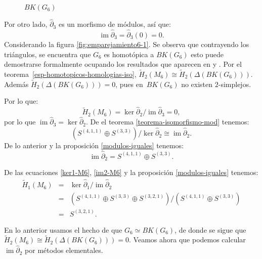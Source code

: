 \documentclass[12pt]{book}
\theoremstyle{definition}
\DeclareMathOperator{\im}{im}
\newcounter{in}
\newcounter{ini}
\begin{document}
\begin{figure}[h]
\begin{center}
\begin{minipage}{0.45\linewidth}
      \caption{$BK(G_{6})$}
      \label{grafica-contraible-M6}
    \end{minipage}
  \end{center}
\end{figure}

Por otro lado, $\widehat\partial_{3}$ es un morfismo de módulos, así que:
\begin{equation*}
  \im\widehat\partial_{3}=\widehat\partial_{3}(0)=0.
  \label{im3-KM5}
\end{equation*}
Considerando la figura \ref{fig:emparejamiento6-1}. Se observa que contrayendo los
triángulos, se encuentra que $G_{6}$ es homotópica a $BK(G_{6})$ esto
puede demostrarse formalmente ocupando los resultados que aparecen en
\cite{LPV08a} y \cite{Pri92}. Por el teorema~\ref{esp-homotopicos-homologias-iso}, $\widetilde
H_{2}(M_{6})\cong\widetilde H_{2}(\Delta(BK(G_{6})))$. Además
$\widetilde H_{2}(\Delta(BK(G_{6})))=0$, pues en~$BK(G_{6})$ no existen $2$-simplejos.

Por lo que:
\begin{equation*}
  \widetilde H_{2}(M_{6})=\ker \widehat\partial_{2}/\im \widehat\partial_{3}=0,
\end{equation*}
por lo que $\im \widehat\partial_{3}=\ker \widehat\partial_{2}$. De el teorema
\ref{teorema-isomorfismo-mod} tenemos:
$$(S^{(4,1,1)}\oplus S^{(3,3)})/\ker \widehat\partial_{2}\cong \im \widehat\partial_{2}.$$
De lo anterior y la proposición \ref{modulos-iguales} tenemos:
\begin{equation}
\im \widehat\partial_{2}=S^{(4,1,1)}\oplus S^{(3,3)}.
\label{im2-M6}
\end{equation}

De las ecuaciones \ref{ker1-M6}, \ref{im2-M6} y la proposición
\ref{modulos-iguales} tenemos:
\begin{eqnarray*}
  \widetilde H_{1}(M_{6})&=&\ker \widehat\partial_{1}/\im
  \widehat\partial_{2}\\
  &=&(S^{(4,1,1)}\oplus S^{(3,3)}\oplus
  S^{(3,2,1)})/(S^{(4,1,1)}\oplus S^{(3,3)})\\
  &=&S^{(3,2,1)}.
\end{eqnarray*}

En lo anterior usamos el hecho de que $G_{6}\simeq BK(G_{6})$, de donde
se sigue que $\widetilde H_{2}(M_{6})\cong\widetilde
H_{2}(\Delta(BK(G_{6})))=0$. Veamos ahora
que podemos calcular $\im \widehat\partial_{2}$ por métodos elementales.
\end{document}
